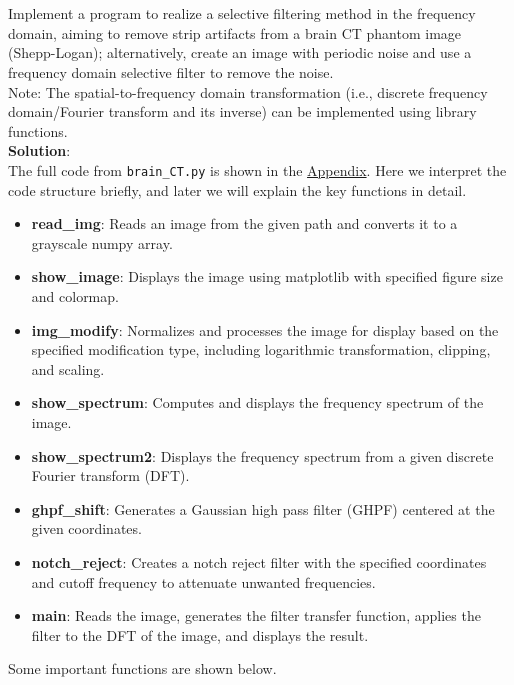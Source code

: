 \documentclass[UTF8]{ctexart}
\begin{document}
\section{}
Implement a program to realize a selective filtering method in the frequency domain,
aiming to remove strip artifacts from a brain CT phantom image (Shepp-Logan);
alternatively, create an image with periodic noise and use a frequency domain selective filter to remove the noise.\\
Note: The spatial-to-frequency domain transformation (i.e., discrete frequency domain/Fourier transform and its inverse) can be implemented using library functions.\\
\textbf{Solution}:\\
The full code from \texttt{brain\_CT.py} is shown in the \hyperlink{code2}{Appendix}. Here we interpret the code structure briefly, and later we will explain the key functions in detail.\\
\begin{itemize}
\item \textbf{read\_img}: Reads an image from the given path and converts it to a grayscale numpy array.
\item \textbf{show\_image}: Displays the image using matplotlib with specified figure size and colormap.
\item \textbf{img\_modify}: Normalizes and processes the image for display based on the specified modification type, including logarithmic transformation, clipping, and scaling.
\item \textbf{show\_spectrum}: Computes and displays the frequency spectrum of the image.
\item \textbf{show\_spectrum2}: Displays the frequency spectrum from a given discrete Fourier transform (DFT).
\item \textbf{ghpf\_shift}: Generates a Gaussian high pass filter (GHPF) centered at the given coordinates.
\item \textbf{notch\_reject}: Creates a notch reject filter with the specified coordinates and cutoff frequency to attenuate unwanted frequencies.
\item \textbf{main}: Reads the image, generates the filter transfer function, applies the filter to the DFT of the image, and displays the result.
\end{itemize}
Some important functions are shown below.
\end{document}
